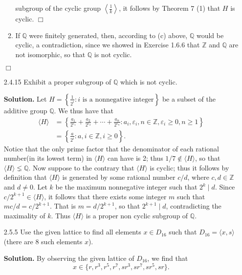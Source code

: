 \documentclass[9pt]{article}
\newcommand{\qed}{\hfill \ensuremath{\Box}}
\newcommand{\cyc}[1]{\langle #1 \rangle}
\newcommand{\Z}{\mathbb{Z}}
\newcommand{\Q}{\mathbb{Q}}
\newcommand{\CYC}[1]{\left\langle #1 \right\rangle}
\begin{document}
\begin{enumerate}
\begin{enumerate}
               subgroup of the cyclic group $\CYC{\frac{1}{k}}$, it follows by
               Theorem 7 (1) that $H$ is cyclic. \qed
         \item If $\Q$ were finitely generated, then, according to (c) above,
               $\Q$ would be cyclic, a contradiction, since we showed in
               Exercise 1.6.6 that $\Z$ and $\Q$ are not isomorphic, so that
               $\Q$ is not cyclic.
      \end{enumerate} \qed
   \item[2.4.15]  Exhibit a proper subgroup of $\Q$ which is not cyclic.

      \textbf{Solution.} Let $H = \left\{\frac{1}{2^i} : i \text{ is a 
      nonnegative integer}\right\}$ be a subset of the additive group $\Q$.
      We thus have that
      \begin{align*}
         \cyc{H} &= \left\{\frac{a_1}{2^{\varepsilon_1}} +
            \frac{a_2}{2^{\varepsilon_2}} + \cdots +
            \frac{a_n}{2^{\varepsilon_n}} : a_i, \varepsilon_i, n \in \Z, 
            \varepsilon_i \ge 0, n \ge 1 \right\} \\
                 &= \left\{\frac{a}{2^i} : a, i \in \Z, i \ge 0\right\}.
      \end{align*}
      Notice that the only prime factor that the denominator of each rational
      number(in its lowest term) in $\cyc{H}$ can have is 2; thus
      $1/7 \notin \cyc{H}$, so that $\cyc{H} \lneq \Q$. Now suppose to the
      contrary that $\cyc{H}$ is cyclic; thus it follows by definition that
      $\cyc{H}$ is generated by some rational number $c/d$, where $c, d \in \Z$
      and $d \neq 0$. Let $k$ be the maximum nonnegative integer such that
      $2^k \mid d$. Since $c/2^{k+1} \in \cyc{H}$, it follows that there exists
      some integer $m$ such that $mc/d = c/2^{k+1}$. That is $m = d / 2^{k+1}$,
      so that $2^{k+1} \mid d$, contradicting the maximality of $k$. Thus
      $\cyc{H}$ is a proper non cyclic subgroup of $\Q$.
   \item[2.5.5]   Use the given lattice to find all elements $x \in D_{16}$
                  such that $D_{16} = \cyc{x, s}$ (there are 8 such elements
                  $x$).
                  
      \textbf{Solution.} By observing the given lattice of $D_{16}$, we find
      that      
      $$x \in \{r, r^3, r^5, r^7, sr^3, sr^7, sr^5, sr\}.$$
\end{enumerate}
\end{document}
